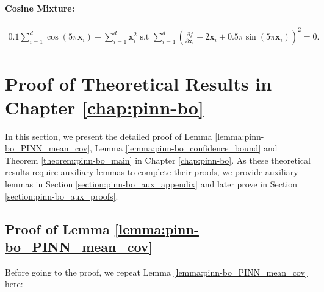 \paragraph{Cosine Mixture:}
\begin{align*}
    0.1 \sum_{i=1}^d \cos(5\pi\mathbf{x}_i) + \sum_{i=1}^d \mathbf{x}_i^2 \text{ s.t } \sum_{i=1}^d \left(\frac{\partial f}{\partial \mathbf{x}_i} - 2\mathbf{x}_i + 0.5\pi\sin(5\pi\mathbf{x}_i) \right)^2 = 0.
\end{align*}

\section{Proof of Theoretical Results in Chapter \ref{chap:pinn-bo}}
\label{section:pinn-bo_appendix}

In this section, we present the detailed proof of Lemma \ref{lemma:pinn-bo_PINN_mean_cov}, Lemma \ref{lemma:pinn-bo_confidence_bound} and Theorem \ref{theorem:pinn-bo_main} in Chapter \ref{chap:pinn-bo}.
 As these theoretical results require auxiliary lemmas to complete their proofs, we provide auxiliary lemmas in Section \ref{section:pinn-bo_aux_appendix} and later prove in Section \ref{section:pinn-bo_aux_proofs}. 
\subsection{Proof of Lemma \ref{lemma:pinn-bo_PINN_mean_cov}}
 Before going to the proof, we repeat Lemma \ref{lemma:pinn-bo_PINN_mean_cov} here:
\PinnMeanCov*


